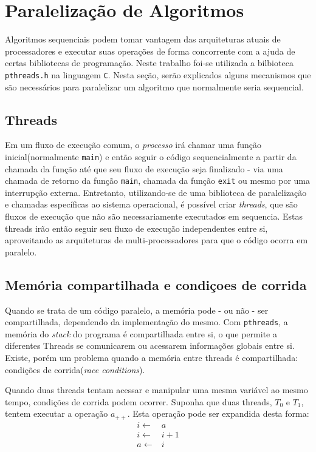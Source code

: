 \section{Paralelização de Algoritmos}
Algoritmos sequenciais podem tomar vantagem das arquiteturas atuais de processadores e executar suas operações de forma concorrente com a ajuda de certas bibliotecas de programação. Neste trabalho foi-se utilizada a bilbioteca \texttt{pthreads.h} na linguagem {\tt C}. Nesta seção, serão explicados alguns mecanismos que são necessários para paralelizar um algoritmo que normalmente seria sequencial.

\subsection{Threads}
Em um fluxo de execução comum, o \textit{processo} irá chamar uma função inicial(normalmente {\tt main}) e então seguir o código sequencialmente a partir da chamada da função até que seu fluxo de execução seja finalizado - via uma chamada de retorno da função {\tt main}, chamada da função {\tt exit} ou mesmo por uma interrupção externa. Entretanto, utilizando-se de uma biblioteca de paralelização e chamadas específicas ao sistema operacional, é possível criar \textit{threads}, que são fluxos de execução que não são necessariamente executados em sequencia. Estas threads irão então seguir seu fluxo de execução independentes entre si, aproveitando as arquiteturas de multi-processadores para que o código ocorra em paralelo.

\subsection{Memória compartilhada e condiçoes de corrida}
Quando se trata de um código paralelo, a memória pode - ou não - ser compartilhada, dependendo da implementação do mesmo. Com {\tt pthreads}, a memória do \textit{stack} do programa é compartilhada entre si, o que permite a diferentes Threads se comunicarem ou acessarem informações globais entre si. Existe, porém um problema quando a memória entre threads é compartilhada: condições de corrida(\textit{race conditions}).

Quando duas threads tentam acessar e manipular uma mesma variável ao mesmo tempo, condições de corrida podem ocorrer. Suponha que duas threads, $T_0$ e $T_1$, tentem executar a operação $a_{++}$. Esta operação pode ser expandida desta forma:
\begin{align}
	i \gets& a \nonumber\\
	i \gets& i+1 \nonumber\\
	a \gets& i \nonumber
\end{align}

